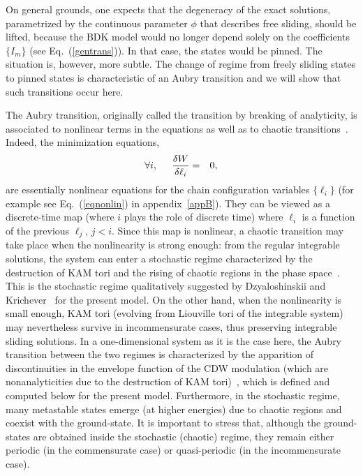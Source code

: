 \documentclass[]{revtex4-1}
\begin{document}
On general grounds, one expects that the degeneracy of the exact
solutions, parametrized by the continuous parameter $\phi$ that
describes free sliding, should be lifted, because the BDK
model would no longer depend solely on the coefficients $\{I_m\}$ (see Eq.~(\ref{gentrans})).
In that case, the states would be pinned. The situation is, however, more subtle. The change of regime from
freely sliding states to pinned states is characteristic of an Aubry
transition and we will show that such transitions occur here.

The Aubry transition, originally called the transition by breaking of analyticity,  is associated to nonlinear terms in the equations as well as to chaotic transitions~\cite{aubry0,aubry_abramovici,aubry_abramovici_raimbault}. Indeed, the minimization equations,
\begin{eqnarray}
\forall i, \hspace{.5cm}  \frac{\delta W}{\delta \ell_i} &=&0,
\end{eqnarray}
are essentially nonlinear equations for the chain configuration variables $\{\ell_i \}$ (for example see Eq.~(\ref{eqnonlin}) in appendix~\ref{appB}). They can be viewed as a discrete-time map (where $i$ plays the role of discrete time) where $\ell_i$ is a function of the previous $\ell_j$, $j<i$. Since this map is nonlinear, a chaotic transition  may take place when the nonlinearity is strong enough: from the regular integrable solutions, the system can enter a stochastic regime characterized by the destruction of KAM tori and the rising of chaotic regions in the phase space~\cite{aubry0,aubry_abramovici,aubry_abramovici_raimbault}.
This is the stochastic regime qualitatively suggested by Dzyaloshinskii and Krichever~\cite{DK} for the present model. On the other hand, when the nonlinearity is small enough, KAM tori (evolving from Liouville tori of the integrable system) may nevertheless survive in incommensurate cases, thus preserving integrable sliding solutions. In a one-dimensional system as it is the case here, the Aubry transition between the two regimes is characterized by the apparition of discontinuities  in the envelope function of the CDW modulation (which are nonanalyticities due to the destruction of KAM tori)~\cite{aubry_ledaeron,aubry_quemerais}, which is defined and computed below for the present model. Furthermore, in the stochastic regime, many metastable states emerge (at higher energies) due to chaotic regions and coexist with the ground-state. It is important to stress that, although the ground-states are obtained inside the stochastic (chaotic) regime, they remain either periodic (in the commensurate case) or quasi-periodic (in the incommensurate case).
\end{document}
